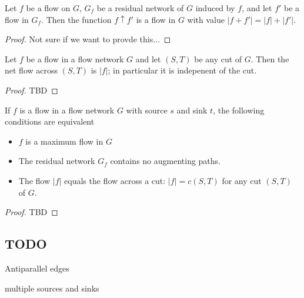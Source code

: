 
\begin{theorem}
  Let $f$ be a flow on $G$, $G_f$ be a residual network of $G$ induced by $f$, and let $f'$ be a flow in $G_f$. Then the function $f \uparrow f'$ is a flow in $G$ with value $|f + f'| = |f| + |f'|.$
\end{theorem}

\begin{proof}
  Not sure if we want to provde this...
\end{proof}



\begin{theorem}
  Let $f$ be a flow in a flow network $G$ and let $(S,T)$ be any cut of $G$. Then the net flow across $(S,T)$ is $|f|$; in particular it is indepenent of the cut.
\end{theorem}

\begin{proof}
  TBD
\end{proof}


\begin{theorem}
  If $f$ is a flow in a flow network $G$ with source $s$ and sink $t$, the following conditions are equivalent
  \begin{itemize}
  \item $f$ is a maximum flow in $G$
  \item The residual network $G_f$ contains no augmenting paths.
  \item The flow $|f|$ equals the flow across a cut: $|f| = c(S,T)$ for any cut $(S,T)$ of $G$.
  \end{itemize}
\end{theorem}

\begin{proof}
  TBD
\end{proof}


\subsection{TODO}

Antiparallel edges

multiple sources and sinks


